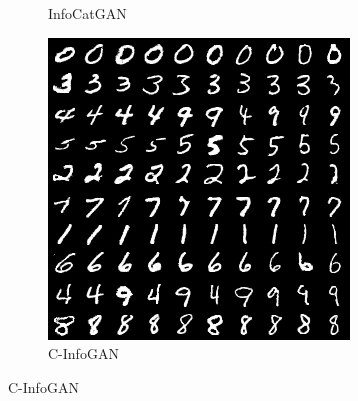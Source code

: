 \begin{figure}[htbp]
\begin{subfigure}[b]{\trif\textwidth}
    \caption{InfoCatGAN}
    \label{ffig:m-icg}
  \end{subfigure}
  \begin{subfigure}[b]{\trif\textwidth}
    \includegraphics[width=\textwidth]{Img/cig-new.png}
    \caption{C-InfoGAN}
    \label{ffig:m-ig}
  \end{subfigure}


\end{figure}
